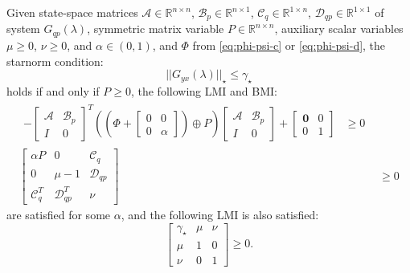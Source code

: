 \begin{thm} \label{thm:l1}
	Given state-space matrices $\mathcal{A} \in \mathbb{R}^{n \times n}$, $\mathcal{B}_p \in \mathbb{R}^{n \times 1}$, $\mathcal{C}_q \in \mathbb{R}^{1 \times n}$, $\mathcal{D}_{qp} \in \mathbb{R}^{1 \times 1}$ of system $G_{qp}(\lambda)$, symmetric matrix variable $P \in \mathbb{R}^{n \times n}$, auxiliary scalar variables $\mu \geq 0$, $\nu \geq 0$, and $\alpha \in (0, 1)$, and $\Phi$ from \autoref{eq:phi-psi-c} or \ref{eq:phi-psi-d}, the \gls{starnorm} condition:
	\begin{equation*}
		||G_{yx}(\lambda)||_\star \leq \gamma_\star
	\end{equation*}
	holds if and only if $P \geq 0$, the following \gls{LMI} and \gls{BMI}:
	\begin{align}
		\begin{split}
			-\begin{bmatrix}
				\mathcal{A} & \mathcal{B}_p \\
				I & 0
			\end{bmatrix}^T
			\left(\left(\Phi + 
			\begin{bmatrix}
				0 & 0 \\
				0 & \alpha
			\end{bmatrix}\right) \oplus P\right)
			\begin{bmatrix}
				\mathcal{A} & \mathcal{B}_p \\
				I & 0
			\end{bmatrix} +
			\begin{bmatrix}
				\mathbf{0} & 0 \\
				0 & 1
			\end{bmatrix} &\geq 0 \label{eq:lmi1-1}
		\end{split} \\
		\begin{bmatrix}
			\alpha P & 0 & \mathcal{C}_q \\
			0 & \mu - 1 & \mathcal{D}_{qp} \\
			\mathcal{C}_q^T & \mathcal{D}_{qp}^T & \nu
		\end{bmatrix} &\geq 0 \label{eq:lmi1-2}
	\end{align}
	are satisfied for some $\alpha$, and the following \gls{LMI} is also satisfied:
	\begin{equation}
		\begin{bmatrix}
			\gamma_\star & \mu & \nu \\
			\mu & 1 & 0 \\
			\nu & 0 & 1
		\end{bmatrix} \geq 0 \label{eq:lmi1-3}.
	\end{equation}
\end{thm}

